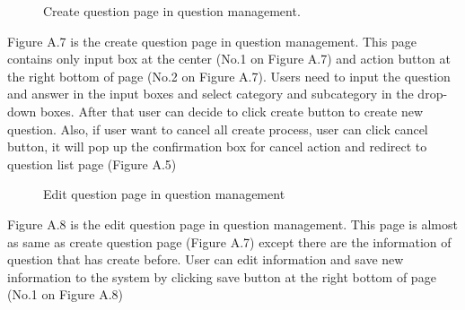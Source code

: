 \documentclass[12pt,oneside,openright,a4paper]{cpe-english-project}
\begin{document}
\begin{figure}[!h]\centering
{}
\caption{Create question page in question management.
}\label{fig:Create question page in question management.
}
\end{figure}
Figure A.7 is the create question page in question management. This page contains 
only input box at the center (No.1 on Figure A.7) and action button at the right bottom of 
page (No.2 on Figure A.7).
Users need to input the question and answer in the input boxes and select category 
and subcategory in the drop-down boxes. After that user can decide to click create button to 
create new question. Also, if user want to cancel all create process, user can click cancel 
button, it will pop up the confirmation box for cancel action and redirect to question list page 
(Figure A.5)
\begin{figure}[!h]\centering
{}
\caption{Edit question page in question management
}\label{fig:Edit question page in question management
}
\end{figure}

Figure A.8 is the edit question page in question management. This page is almost as 
same as create question page (Figure A.7) except there are the information of question that 
has create before. User can edit information and save new information to the system by 
clicking save button at the right bottom of page (No.1 on Figure A.8)\\
\end{document}
